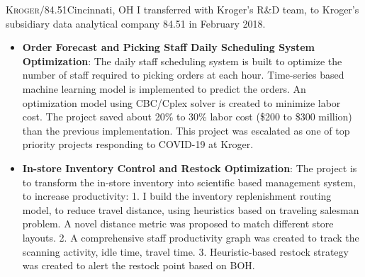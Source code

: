 \documentclass[12pt,a4paper,sans]{moderncv} %
\begin{document}
 



\bigskip
{}
{\textsc{Kroger/84.51}}{Cincinnati, OH}{}{
I transferred with Kroger's R\&D team, to Kroger's subsidiary data analytical company 84.51 in February 2018.}
\begin{itemize}
\item \textbf{Order Forecast and Picking Staff Daily Scheduling System Optimization}: 
    The daily staff scheduling system is built to optimize the number of staff required to picking 
    orders at each hour.
    Time-series based machine learning model is implemented to predict the orders. 
    An optimization model using CBC/Cplex solver is created to minimize labor cost. 
    The project saved about 20\% to 30\% labor cost (\$200 to \$300 million) than the previous implementation. 
    This project was escalated as one of top priority projects responding to COVID-19 at Kroger.
\item \textbf{In-store Inventory Control and Restock Optimization}:
The project is to transform the in-store inventory into scientific based management system, to increase productivity:
1. I build the inventory replenishment routing model, to reduce travel distance, using heuristics based on traveling salesman problem. A novel distance metric was proposed to match different store layouts. 
2. A comprehensive staff productivity graph was created to track the scanning activity, idle time, travel time.
3. Heuristic-based restock strategy was created to alert the restock point based on BOH. 


\end{itemize}



\bigskip

{} 
{}
\end{document}
